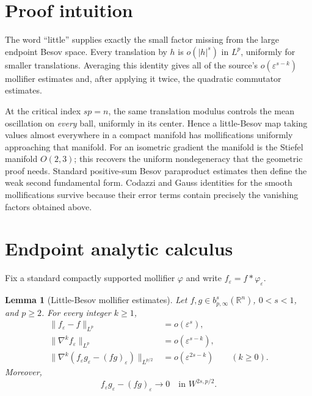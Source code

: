 \documentclass[11pt]{article}
\newtheorem{lemma}[theorem]{Lemma}
\newcommand{\R}{\mathbb R}
\newcommand{\eps}{\varepsilon}
\begin{document}
\section*{Proof intuition}

The word ``little'' supplies exactly the small factor missing from the large
endpoint Besov space.  Every translation by $h$ is
$o(|h|^s)$ in $L^p$, uniformly for smaller translations.  Averaging this
identity gives all of the source's $o(\eps^{s-k})$ mollifier estimates and,
after applying it twice, the quadratic commutator estimates.

At the critical index $sp=n$, the same translation modulus controls the
mean oscillation on \emph{every} ball, uniformly in its center.  Hence a
little-Besov map taking values almost everywhere in a compact manifold has
mollifications uniformly approaching that manifold.  For an isometric
gradient the manifold is the Stiefel manifold $O(2,3)$; this recovers the
uniform nondegeneracy that the geometric proof needs.  Standard positive-sum
Besov paraproduct estimates then define the weak second fundamental form.
Codazzi and Gauss identities for the smooth mollifications survive because
their error terms contain precisely the vanishing factors obtained above.

\section*{Endpoint analytic calculus}

Fix a standard compactly supported mollifier $\varphi$ and write
$f_\eps=f*\varphi_\eps$.

\begin{lemma}[Little-Besov mollifier estimates]\label{lem:moll}
Let $f,g\in b^s_{p,\infty}(\R^n)$, $0<s<1$, and $p\geq2$.  For every integer
$k\geq1$,
\begin{align*}
 \|f_\eps-f\|_{L^p}&=o(\eps^s),\\
 \|\nabla^k f_\eps\|_{L^p}&=o(\eps^{s-k}),\\
 \|\nabla^k(f_\eps g_\eps-(fg)_\eps)\|_{L^{p/2}}
 &=o(\eps^{2s-k})\qquad(k\geq0).
\end{align*}
Moreover,
\[
 f_\eps g_\eps-(fg)_\eps\longrightarrow0
 \quad\text{in }W^{2s,p/2}.
\]
\end{lemma}
\end{document}
